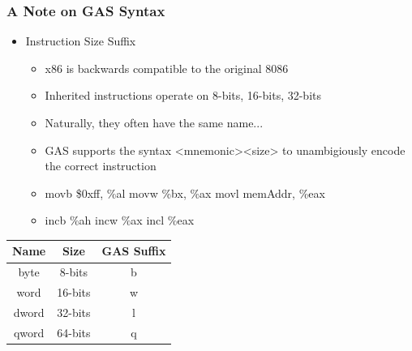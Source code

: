 \documentclass[11pt,xcolor=dvipsnames]{beamer}
\begin{document}
\begin{frame}[fragile,t]
\frametitle{A Note on GAS Syntax}
\begin{itemize}
    \item Instruction Size Suffix
    \begin{itemize}
        \item x86 is backwards compatible to the original 8086
        \item Inherited instructions operate on 8-bits, 16-bits, 32-bits
        \item Naturally, they often have the same name...
        \item GAS supports the syntax {\ttfamily <mnemonic><size>} to unambigiously encode the correct instruction
        \item {\ttfamily movb \$0xff, \%al \;\; movw \%bx, \%ax \;\; movl memAddr, \%eax}
        \item {\ttfamily incb \%ah \;\; incw \%ax \;\; incl \%eax}
    \end{itemize}
\end{itemize}
\begin{center}
\begin{tabular}{c|c|c}
\textbf{Name} & \textbf{Size} & \textbf{GAS Suffix} \\
\hline \hline
byte & 8-bits & b \\
word & 16-bits & w \\
dword & 32-bits & l \\
qword & 64-bits & q \\
\end{tabular}
\end{center}
\end{frame}
\end{document}
